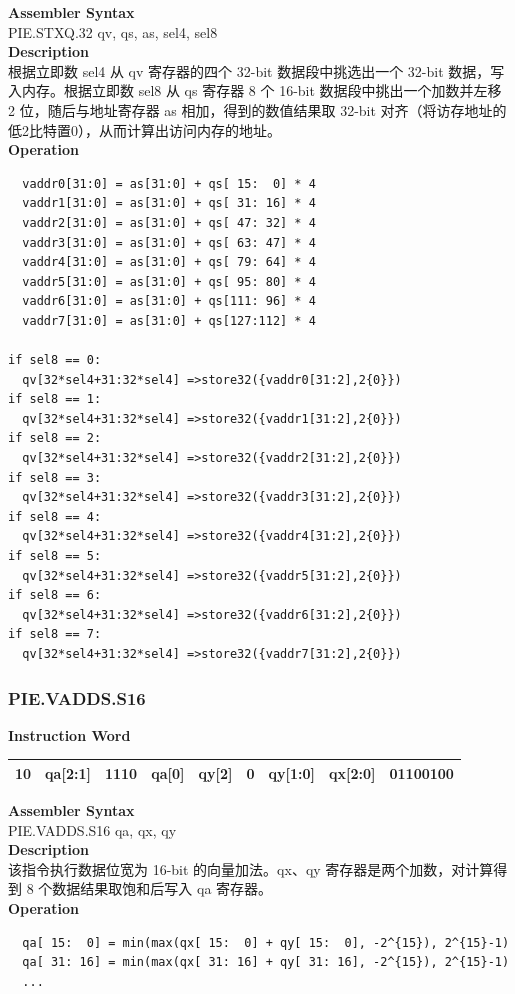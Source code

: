 \textbf{Assembler Syntax} \\
PIE.STXQ.32 qv, qs, as, sel4, sel8 \\
\textbf{Description} \\
根据立即数 sel4 从 qv 寄存器的四个 32-bit 数据段中挑选出一个 32-bit 数据，写入内存。根据立即数 sel8 从 qs 寄存器 8 个 16-bit 数据段中挑出一个加数并左移 2 位，随后与地址寄存器 as 相加，得到的数值结果取 32-bit 对齐（将访存地址的低2比特置0），从而计算出访问内存的地址。\\
\textbf{Operation}
\begin{lstlisting}
  vaddr0[31:0] = as[31:0] + qs[ 15:  0] * 4
  vaddr1[31:0] = as[31:0] + qs[ 31: 16] * 4
  vaddr2[31:0] = as[31:0] + qs[ 47: 32] * 4
  vaddr3[31:0] = as[31:0] + qs[ 63: 47] * 4
  vaddr4[31:0] = as[31:0] + qs[ 79: 64] * 4
  vaddr5[31:0] = as[31:0] + qs[ 95: 80] * 4
  vaddr6[31:0] = as[31:0] + qs[111: 96] * 4
  vaddr7[31:0] = as[31:0] + qs[127:112] * 4

if sel8 == 0:
  qv[32*sel4+31:32*sel4] =>store32({vaddr0[31:2],2{0}})
if sel8 == 1:
  qv[32*sel4+31:32*sel4] =>store32({vaddr1[31:2],2{0}})
if sel8 == 2:
  qv[32*sel4+31:32*sel4] =>store32({vaddr2[31:2],2{0}})
if sel8 == 3:
  qv[32*sel4+31:32*sel4] =>store32({vaddr3[31:2],2{0}})
if sel8 == 4:
  qv[32*sel4+31:32*sel4] =>store32({vaddr4[31:2],2{0}})
if sel8 == 5:
  qv[32*sel4+31:32*sel4] =>store32({vaddr5[31:2],2{0}})
if sel8 == 6:
  qv[32*sel4+31:32*sel4] =>store32({vaddr6[31:2],2{0}})
if sel8 == 7:
  qv[32*sel4+31:32*sel4] =>store32({vaddr7[31:2],2{0}})
\end{lstlisting}

\newpage
\subsubsection{PIE.VADDS.S16}\label{instruction:PIEVADDSS16}
\setlength\tabcolsep{6pt}
\textbf{Instruction Word} \\
\begin{tabular}{|c|c|c|c|c|c|c|c|c|}
	\hline
	10 & qa[2:1] & 1110 & qa[0] & qy[2] & 0 & qy[1:0] & qx[2:0] & 01100100 \\
	\hline
\end{tabular}

\textbf{Assembler Syntax} \\
PIE.VADDS.S16 qa, qx, qy \\
\textbf{Description} \\
该指令执行数据位宽为 16-bit 的向量加法。qx、qy 寄存器是两个加数，对计算得到 8 个数据结果取饱和后写入 qa 寄存器。\\
\textbf{Operation}
\begin{lstlisting}
  qa[ 15:  0] = min(max(qx[ 15:  0] + qy[ 15:  0], -2^{15}), 2^{15}-1)
  qa[ 31: 16] = min(max(qx[ 31: 16] + qy[ 31: 16], -2^{15}), 2^{15}-1)
  ...
\end{lstlisting}

